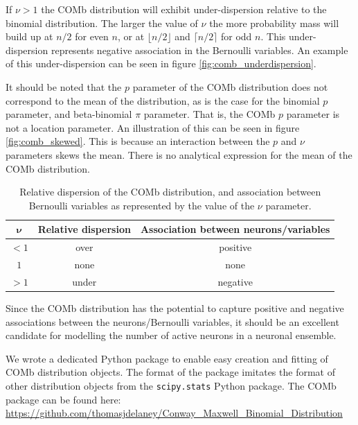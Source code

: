       If $\nu > 1$ the COMb distribution will exhibit under-dispersion relative to the binomial distribution. The larger the value of $\nu$ the more probability mass will build up at $n/2$ for even $n$, or at $\lfloor n/2 \rfloor$ and $\lceil n/2 \rceil$ for odd $n$. This under-dispersion represents negative association in the Bernoulli variables. An example of this under-dispersion can be seen in figure \ref{fig:comb_underdispersion}.

      It should be noted that the $p$ parameter of the COMb distribution does not correspond to the mean of the distribution, as is the case for the binomial $p$ parameter, and beta-binomial $\pi$ parameter. That is, the COMb $p$ parameter is not a location parameter. An illustration of this can be seen in figure \ref{fig:comb_skewed}. This is because an interaction between the $p$ and $\nu$ parameters skews the mean. There is no analytical expression for the mean of the COMb distribution.

      \begin{table}
        \centering
        \begin{tabular}[h]{|c|c|c|}
          \hline
          $\boldsymbol{\nu}$  & \textbf{Relative dispersion}  & \textbf{Association between neurons/variables} \\ \hline
          $<1$                & over                          & positive                                      \\ \hline
          $1$                 & none                          & none                                          \\ \hline
          $>1$                & under                         & negative                                      \\ \hline
        \end{tabular}
        \caption{Relative dispersion of the COMb distribution, and association between Bernoulli variables as represented by the value of the $\nu$ parameter.}
      \end{table}


      Since the COMb distribution has the potential to capture positive and negative associations between the neurons/Bernoulli variables, it should be an excellent candidate for modelling the number of active neurons in a neuronal ensemble.

      We wrote a dedicated Python package to enable easy creation and fitting of COMb distribution objects. The format of the package imitates the format of other distribution objects from the \texttt{scipy.stats} Python package. The COMb package can be found here: \\
      \url{https://github.com/thomasjdelaney/Conway_Maxwell_Binomial_Distribution}

